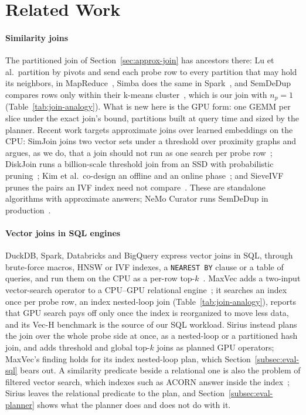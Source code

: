 \section{Related Work}\label{sec:related}

\paragraph{Similarity joins}
The partitioned join of Section~\ref{sec:approx-join} has ancestors there: Lu et al.\ partition by pivots and send each probe row to every partition that may hold its neighbors, in MapReduce~\cite{LuKNNMapReduce12}, Simba does the same in Spark~\cite{XieSimba16}, and SemDeDup compares rows only within their k-means cluster~\cite{AbbasSemDeDup23}, which is our join with $n_p=1$ (Table~\ref{tab:join-analogy}).
What is new here is the GPU form: one GEMM per slice under the exact join's bound, partitions built at query time and sized by the planner.
Recent work targets approximate joins over learned embeddings on the CPU: SimJoin joins two vector sets under a threshold over proximity graphs and argues, as we do, that a join should not run as one search per probe row~\cite{XieSimJoin25}; DiskJoin runs a billion-scale threshold join from an SSD with probabilistic pruning~\cite{ChenDiskJoin25}; Kim et al.\ co-design an offline and an online phase~\cite{KimVectorJoin26}; and SieveIVF prunes the pairs an IVF index need not compare~\cite{HuSieveIVF26}.
These are standalone algorithms with approximate answers; NeMo Curator runs SemDeDup in production~\cite{NeMoCurator}.

\paragraph{Vector joins in SQL engines}
DuckDB, Spark, Databricks and BigQuery express vector joins in SQL, through brute-force macros, HNSW or IVF indexes, a \texttt{NEAREST BY} clause or a table of queries, and run them on the CPU as a per-row top-$k$~\cite{DuckDBVSS, DuckDBVSSBlog24, DuckDBNearestByPR24137, SparkNearestByJoin26, DatabricksNearestByJoinBlog26, BigQueryVectorSearchFn}.
MaxVec adds a two-input vector-search operator to a CPU--GPU relational engine~\cite{MaxVec26}; it searches an index once per probe row, an index nested-loop join (Table~\ref{tab:join-analogy}), reports that GPU search pays off only once the index is reorganized to move less data, and its Vec-H benchmark is the source of our SQL workload.
Sirius instead plans the join over the whole probe side at once, as a nested-loop or a partitioned hash join, and adds threshold and global top-$k$ joins as planned GPU operators; MaxVec's finding holds for its index nested-loop plan, which Section~\ref{subsec:eval-sql} bears out.
A similarity predicate beside a relational one is also the problem of filtered vector search, which indexes such as ACORN answer inside the index~\cite{PatelACORN24}; Sirius leaves the relational predicate to the plan, and Section~\ref{subsec:eval-planner} shows what the planner does and does not do with it.

